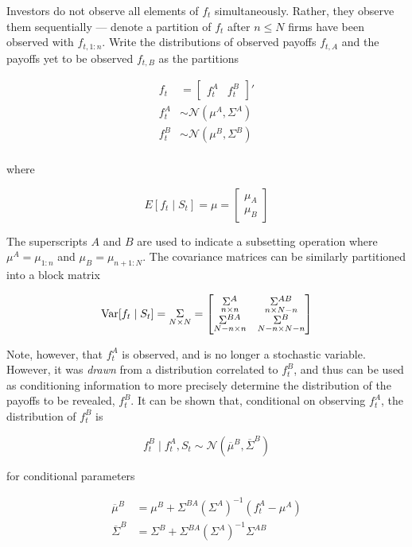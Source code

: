 \documentclass{article}
\begin{document}
Investors do not observe all elements of $f_t$ simultaneously. Rather, they observe them sequentially --- denote a partition of $f_t$ after $n \le N$ firms have been observed with $f_{t,1:n}$. Write the distributions of observed payoffs $f_{t,A}$ and the payoffs yet to be observed $f_{t,B}$ as the partitions

\begin{align*}
    f_t &= \begin{bmatrix}
        f^A_t & f^B_t
    \end{bmatrix}' \\ 
    f^A_{t} &\sim \mathcal{N}(\mu^A, \Sigma^A) \\
    f^B_{t} &\sim \mathcal{N}(\mu^B, \Sigma^B) \\
\end{align*}

\noindent where 

$$
E[f_t \mid S_t] = \mu = \begin{bmatrix}
    \mu_A \\
    \mu_B
\end{bmatrix}
$$

The superscripts $A$ and $B$ are used to indicate a subsetting operation where $\mu^A = \mu_{1:n}$ and $\mu_B = \mu_{n+1:N}$. The covariance matrices can be similarly partitioned into a block matrix

$$
\text{Var}[f_t \mid S_t] = \underset{N \times N}{\Sigma} = \begin{bmatrix}
    \underset{n\times n}{\Sigma^A} & \underset{n\times N-n}{\Sigma^{AB}} \\
    \underset{N-n\times n}{\Sigma^{BA}} & \underset{N-n\times N-n}{\Sigma^B} \\
\end{bmatrix}
$$

Note, however, that $f_t^A$ is observed, and is no longer a stochastic variable. However, it was \textit{drawn} from a distribution correlated to $f_t^B$, and thus can be used as conditioning information to more precisely determine the distribution of the payoffs to be revealed, $f_t^B$. It can be shown  that, conditional on observing $f_t^A$, the distribution of $f_t^B$ is

$$
f_t^B \mid f_t^A, S_t \sim \mathcal{N} (\overline \mu^B, \overline \Sigma^B)
$$

\noindent for conditional parameters

\begin{align*}
    \overline \mu^B &= \mu^B + \Sigma^{BA} (\Sigma^{A})^{-1}(f_t^A - \mu^A)\\
    \overline \Sigma^B &= \Sigma^B + \Sigma^{BA} (\Sigma^{A})^{-1}\Sigma^{AB}
\end{align*}
\end{document}
